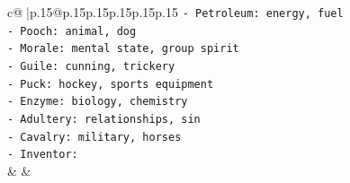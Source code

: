 \documentclass{article}
\begin{document}
{\begin{supertabular}{c@{$\;$}|p{.15\linewidth}@{}p{.15\linewidth}p{.15\linewidth}p{.15\linewidth}p{.15\linewidth}p{.15\linewidth}}
{{{\texttt{{-} Petroleum: energy, fuel} \\
\texttt{{-} Pooch: animal, dog} \\
\texttt{{-} Morale: mental state, group spirit} \\
\texttt{{-} Guile: cunning, trickery} \\
\texttt{{-} Puck: hockey, sports equipment} \\
\texttt{{-} Enzyme: biology, chemistry} \\
\texttt{{-} Adultery: relationships, sin} \\
\texttt{{-} Cavalry: military, horses} \\
\texttt{{-} Inventor:} \\
            }
        }
    }
    & & \\ \\


\end{supertabular}}
\end{document}
